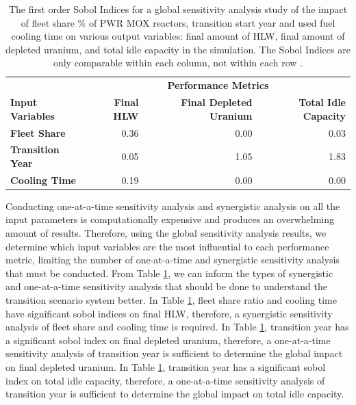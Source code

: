     \begin{table}[]
        \centering
        \doublespacing
        \caption{The first order Sobol Indices for a global sensitivity analysis study of the impact of 
        fleet share \% of PWR MOX reactors, transition start year and used fuel cooling time on various output
        variables: final amount of HLW, final amount of depleted uranium, and total 
        idle capacity in the simulation. The Sobol Indices are only comparable within each column, 
        not within each row \cite{chee_arfc/dcwrapper_2019}.}
        \label{tab:sobol}
            \small
            \begin{tabular}{l|rrr}
                \hline	
                & \multicolumn{3}{c}{\textbf{Performance Metrics}} \\ \cline{2-4}
                \textbf{Input Variables} & \textbf{Final HLW} & \textbf{Final Depleted Uranium} & \textbf{Total Idle Capacity} \\ \hline
                \textbf{Fleet Share} & 0.36     & 0.00                      & 0.03             \\
                \textbf{Transition Year} & 0.05     & 1.05                  & 1.83               \\
                \textbf{Cooling Time}  & 0.19     & 0.00                      & 0.00                   \\ \hline

            \end{tabular}
    \end{table}

Conducting one-at-a-time sensitivity analysis and synergistic analysis on all 
the input parameters is computationally expensive and produces an overwhelming amount 
of results. 
Therefore, using the global sensitivity analysis results, we determine which 
input variables are the most influential to each performance metric, limiting 
the number of one-at-a-time and synergistic sensitivity analysis that must be 
conducted. 
From Table \ref{tab:sobol}, we can inform the types of synergistic and one-at-a-time 
sensitivity analysis that should be done 
to understand the transition scenario system better.
In Table \ref{tab:sobol}, fleet share ratio and cooling time have significant 
sobol indices on final HLW, therefore, a synergistic sensitivity analysis of fleet 
share and cooling time is required. 
In Table \ref{tab:sobol}, transition year has a significant sobol index on final 
depleted uranium, therefore, a one-at-a-time sensitivity analysis of transition 
year is sufficient to determine the global impact on final depleted uranium. 
In Table \ref{tab:sobol}, transition year has a significant sobol index on total 
idle capacity, therefore, a one-at-a-time sensitivity analysis of transition 
year is sufficient to determine the global impact on total idle capacity. 

